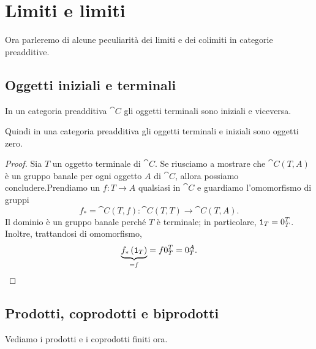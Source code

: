 \section{Limiti e limiti}

Ora parleremo di alcune peculiarità dei limiti e dei colimiti in
categorie preadditive.


\subsection{Oggetti iniziali e terminali}

\begin{proposition}
  In un categoria preadditiva \(\cat C\) gli oggetti terminali sono
  iniziali e viceversa.
\end{proposition}

Quindi in una categoria preadditiva gli oggetti terminali e iniziali
sono oggetti zero.

\begin{proof}
  Sia \(T\) un oggetto terminale di \(\cat C\). Se riusciamo a mostrare
  che \(\cat C(T, A)\) è un gruppo banale per ogni oggetto \(A\) di
  \(\cat C\), allora possiamo concludere.\newline Prendiamo un
  \(f : T \to A\) qualsiasi in \(\cat C\) e guardiamo l'omomorfismo di
  gruppi
  \[
    f_\ast = \cat C(T, f) : \cat C(T, T) \to \cat C(T, A) .
  \]
  Il dominio è un gruppo banale perché \(T\) è terminale; in
  particolare, \(\mathtt 1_T = 0_T^T\). Inoltre, trattandosi di omomorfismo,
  \[
    \underbrace{f_\ast \left(\id_T\right)}_{= f} = f 0_T^T = 0_T^A
    . \qedhere
  \]
\end{proof}


\subsection{Prodotti, coprodotti e biprodotti}

Vediamo i prodotti e i coprodotti finiti ora.

